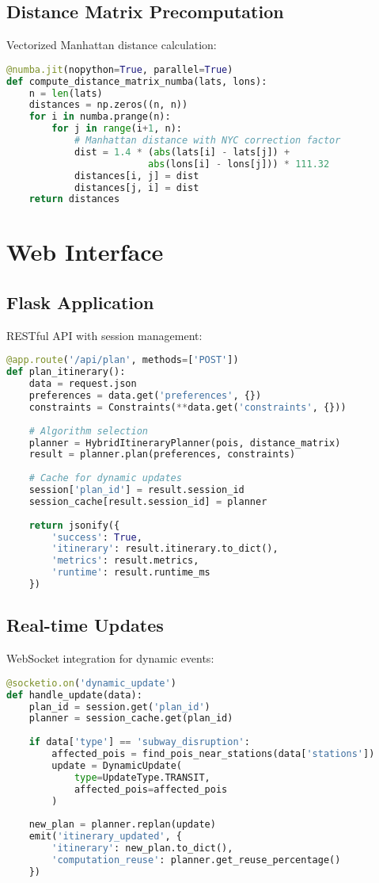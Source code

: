 \subsection{Distance Matrix Precomputation}
Vectorized Manhattan distance calculation:
\begin{lstlisting}[language=Python]
@numba.jit(nopython=True, parallel=True)
def compute_distance_matrix_numba(lats, lons):
    n = len(lats)
    distances = np.zeros((n, n))
    for i in numba.prange(n):
        for j in range(i+1, n):
            # Manhattan distance with NYC correction factor
            dist = 1.4 * (abs(lats[i] - lats[j]) + 
                         abs(lons[i] - lons[j])) * 111.32
            distances[i, j] = dist
            distances[j, i] = dist
    return distances
\end{lstlisting}

\section{Web Interface}

\subsection{Flask Application}
RESTful API with session management:
\begin{lstlisting}[language=Python]
@app.route('/api/plan', methods=['POST'])
def plan_itinerary():
    data = request.json
    preferences = data.get('preferences', {})
    constraints = Constraints(**data.get('constraints', {}))
    
    # Algorithm selection
    planner = HybridItineraryPlanner(pois, distance_matrix)
    result = planner.plan(preferences, constraints)
    
    # Cache for dynamic updates
    session['plan_id'] = result.session_id
    session_cache[result.session_id] = planner
    
    return jsonify({
        'success': True,
        'itinerary': result.itinerary.to_dict(),
        'metrics': result.metrics,
        'runtime': result.runtime_ms
    })
\end{lstlisting}

\subsection{Real-time Updates}
WebSocket integration for dynamic events:
\begin{lstlisting}[language=Python]
@socketio.on('dynamic_update')
def handle_update(data):
    plan_id = session.get('plan_id')
    planner = session_cache.get(plan_id)
    
    if data['type'] == 'subway_disruption':
        affected_pois = find_pois_near_stations(data['stations'])
        update = DynamicUpdate(
            type=UpdateType.TRANSIT,
            affected_pois=affected_pois
        )
        
    new_plan = planner.replan(update)
    emit('itinerary_updated', {
        'itinerary': new_plan.to_dict(),
        'computation_reuse': planner.get_reuse_percentage()
    })
\end{lstlisting}

